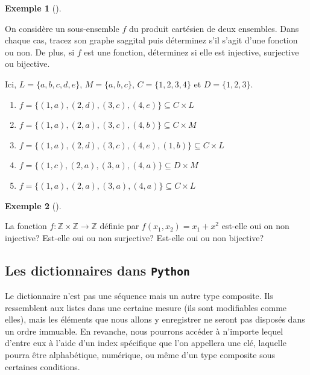 \documentclass[
  letterpaper,
]{scrbook}
\providecommand{\tightlist}{%
  \setlength{\itemsep}{0pt}\setlength{\parskip}{0pt}}\usepackage{longtable,booktabs,array}
\newcommand{\set}[1]{\{#1\}}
\theoremstyle{plain}
\theoremstyle{definition}
\newtheorem{example}{Exemple}[chapter]
\theoremstyle{definition}
\theoremstyle{remark}
\begin{document}
\leavevmode{}%
\begin{example}[]\label{exm-fonction-injective-surjective-bijective}

On considère un sous-ensemble \(f\) du produit cartésien de deux
ensembles. Dans chaque cas, tracez son graphe saggital puis déterminez
s'il s'agit d'une fonction ou non. De plus, si \(f\) est une fonction,
déterminez si elle est injective, surjective ou bijective.

Ici, \(L=\set{a,b,c,d,e}\), \(M=\set{a,b,c}\), \(C=\set{1,2,3,4}\) et
\(D=\set{1,2,3}\).

\begin{enumerate}
\def\labelenumi{\alph{enumi}.}
\tightlist
\item
  \(f=\set{(1,a),(2,d),(3,c),(4,e)}\subseteq C \times L\)
\item
  \(f=\set{(1,a),(2,a),(3,c),(4,b)}\subseteq C \times M\)
\item
  \(f=\set{(1,a),(2,d),(3,c),(4,e),(1,b)}\subseteq C \times L\)
\item
  \(f=\set{(1,c),(2,a),(3,a),(4,a)}\subseteq D \times M\)
\item
  \(f=\set{(1,a),(2,a),(3,a),(4,a)}\subseteq C \times L\)
\end{enumerate}

\end{example}

\leavevmode{}%
\begin{example}[]\label{exm-fonction-dans-Z}

La fonction \(f:\mathbb{Z}\times\mathbb{Z}\rightarrow \mathbb{Z}\)
définie par \(f(x_1,x_2)=x_1+x^2\) est-elle oui on non injective?
Est-elle oui ou non surjective? Est-elle oui ou non bijective?

\end{example}

\hypertarget{les-dictionnaires-dans-python}{%
\subsection{\texorpdfstring{Les dictionnaires dans
\texttt{Python}}{Les dictionnaires dans Python}}\label{les-dictionnaires-dans-python}}

Le dictionnaire n'est pas une séquence mais un autre type composite. Ils
ressemblent aux listes dans une certaine mesure (ils sont modifiables
comme elles), mais les éléments que nous allons y enregistrer ne seront
pas disposés dans un ordre immuable. En revanche, nous pourrons accéder
à n'importe lequel d'entre eux à l'aide d'un index spécifique que l'on
appellera une clé, laquelle pourra être alphabétique, numérique, ou même
d'un type composite sous certaines conditions.
\end{document}
